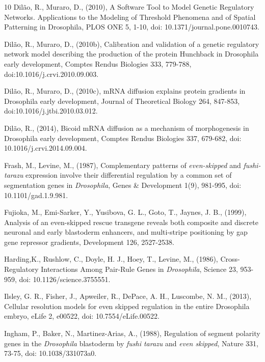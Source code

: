 \documentclass[final,authoryear, 5p, times]{elsarticle}
\begin{document}
\begin{thebibliography}{10}
  Dil\~ao, R., Muraro, D., (2010),  A Software Tool to Model Genetic Regulatory Networks. Applications to the Modeling of Threshold Phenomena and of Spatial Patterning in Drosophila, PLOS ONE 5, 1-10, doi: 10.1371/journal.pone.0010743.

 Dil\~ao, R., Muraro, D., (2010b), Calibration and validation of a genetic regulatory network model describing the production of the protein Hunchback in Drosophila early development, Comptes Rendus Biologies 333, 779-788, doi:10.1016/j.crvi.2010.09.003.

 Dil\~ao, R., Muraro, D., (2010c), mRNA diffusion explains protein gradients in Drosophila early development, Journal of Theoretical Biology  264, 847-853, doi:10.1016/j.jtbi.2010.03.012.

 Dil\~ao, R., (2014), Bicoid mRNA diffusion as a mechanism of morphogenesis in Drosophila early development, Comptes Rendus Biologies 337, 679-682, doi: 10.1016/j.crvi.2014.09.004.

  Frash, M., Levine, M., (1987),  Complementary patterns of \textit{even-skipped} and \textit{fushi-tarazu} expression involve their differential regulation by a common set of segmentation genes in \textit{Drosophila}, Genes \& Development 1(9),  981-995,  doi: 10.1101/gad.1.9.981.

   Fujioka, M.,  Emi-Sarker, Y., Yusibova,  G. L.,  Goto, T.,  Jaynes, J. B., (1999),  Analysis of an even-skipped rescue transgene reveals both composite and discrete neuronal and early blastoderm enhancers, and multi-stripe positioning by gap gene repressor gradients, Development 126, 2527-2538.

  Harding,K.,   Rushlow, C.,  Doyle, H. J.,  Hoey, T.,  Levine, M., (1986), Cross-Regulatory Interactions Among Pair-Rule Genes in \textit{Drosophila}, Science 23, 953-959, doi: 10.1126/science.3755551.

 Ilsley, G. R.,  Fisher, J.,  Apweiler, R.,  DePace, A. H.,    Luscombe, N. M., (2013), Cellular resolution models for even skipped regulation in the entire Drosophila embryo, eLife 2, e00522,  doi: 10.7554/eLife.00522.

  Ingham, P.,   Baker, N.,  Martinez-Arias, A., (1988), Regulation of segment polarity genes in the \textit{Drosophila} blastoderm by \textit{fushi tarazu} and \textit{even skipped}, Nature 331, 73-75, doi: 10.1038/331073a0.


\end{thebibliography}
\end{document}

